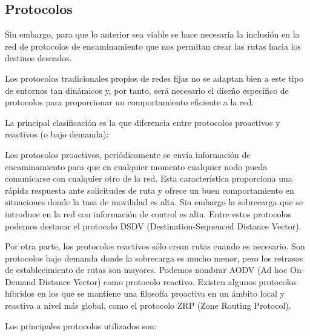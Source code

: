 \subsection{Protocolos}
Sin embargo, para que lo anterior sea viable se hace necesaria la inclusi\'on en la red de protocolos de encaminamiento
que nos permitan crear las rutas hacia los destinos deseados. 

Los protocolos tradicionales propios de redes fijas no se adaptan bien a este tipo de entornos tan din\'amicos y, por
tanto, ser\'a necesario el dise\~no espec\'ifico de protocolos para proporcionar un comportamiento eficiente a la red. 

La principal clasificaci\'on es la que diferencia entre protocolos proactivos y reactivos (o bajo demanda): 

Los protocolos proactivos, peri\'odicamente se env\'ia informaci\'on de encaminamiento para que en cualquier momento cualquier
nodo pueda comunicarse con cualquier otro de la red. Esta caracter\'istica proporciona una r\'apida respuesta ante
solicitudes de ruta y ofrece un buen comportamiento en situaciones donde la tasa de movilidad es alta. Sin embargo la
sobrecarga que se introduce en la red con informaci\'on de control es alta. Entre estos protocolos podemos destacar el
protocolo DSDV (Destination-Sequenced Distance Vector).

Por otra parte, los protocolos reactivos s\'olo crean rutas cuando es necesario. Son protocolos bajo demanda donde la
sobrecarga es mucho menor, pero los retrasos de establecimiento de rutas son mayores. Podemos nombrar AODV (Ad hoc
On-Demand Distance Vector) como protocolo reactivo. Existen algunos protocolos h\'ibridos en los que se mantiene una
filosof\'ia proactiva en un \'ambito local y reactiva a nivel m\'as global, como el protocolo ZRP (Zone Routing Protocol).

Los principales protocolos utilizados son:

